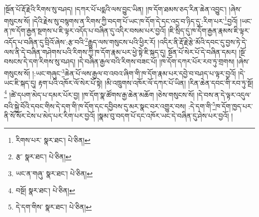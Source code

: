 །སྔོན་པོ་རྡོ་རྗེའི་རིགས་སུ་བཤད། །དཀར་པོ་པདྨའི་ལས་བྱུང་ཡིན། །ཁ་དོག་ཐམས་ཅད་རིན་ཆེན་འབྱུང་། །ཞེས་གསུངས་སོ། །དེའི་རྗེས་སུ་བསྙགས་ན་རིགས་ཀྱི་བདག་པོ་ཡང་ཁ་དོག་དེ་དང་འདྲ་བ་ཉིད་དུ་:རིག་པར་\footnote{རིགས་པར་  སྣར་ཐང་།  པེ་ཅིན། }བྱའོ། །ཡང་ན་ཁ་དོག་རྒྱན་སྔགས་པ་ཇི་ལྟར་འདོད་པ་བཞིན་དུ་འདིར་བསམ་པར་བྱའོ། །ཇི་སྲིད་དུ་ཁ་དོག་རྒྱན་རྣམས་ཇི་ལྟར་འདོད་པ་བཞིན་དུ་བྲིའོ་ཞེས་:རྩ་བའི་\footnote{རྩ་  སྣར་ཐང་།  པེ་ཅིན། }རྒྱུད་ལས་གསུངས་པའི་ཕྱིར་རོ། །འདིར་ནི་རྡོ་རྗེ་རྩེ་མོའི་དབང་དུ་བྱས་ཏེ་དེ་ལས་ནི་དེ་བཞིན་གཤེགས་པའི་རིགས་ཀྱི་ཁ་དོག་རྣམ་པར་ཕྱེ་སྟེ་ཇི་སྐད་དུ། སྔོན་པོ་སེར་པོ་དེ་བཞིན་དམར། །སྔོ་བསངས་དེ་དག་རིགས་སུ་བཤད། །དེ་བཞིན་རྒྱལ་བའི་རིགས་བཟང་པོ། །ཁ་དོག་དཀར་པོར་རབ་ཏུ་གྲགས། །ཞེས་གསུངས་སོ། །:ཡང་གཞུང་\footnote{ཡང་ན་གཞུ་  སྣར་ཐང་།  པེ་ཅིན། }ཆེན་པོ་ལས་རྒྱལ་བ་འབའ་ཞིག་གི་ཁ་དོག་རྣམ་པར་དབྱེ་བ་བཤད་པ་ལྟར་བྱའོ། །དེ་ཡང་ཇི་སྐད་དུ། རྟག་པའི་འཁོར་ལོ་སེར་པོ་སྟེ། །མི་འཁྲུགས་འཁོར་ལོ་དཀར་པོ་ཡིན། །རིན་ཆེན་དབང་གི་རབ་ཏུ་སྔོ།\footnote{བསྔོ།  སྣར་ཐང་།  པེ་ཅིན། } །ཚེ་དཔག་མེད་པ་དམར་པོར་བྱ། །ཁ་དོག་སྣ་ཚོགས་རྒྱ་ཆེན་མཆོག །ཅེས་གསུངས་སོ། །དེ་བས་ན་དེ་ལྟར་འདུལ་བའི་སྐྱེ་བོའི་དབང་གིས་དེ་དག་གི་ཁ་དོག་དང་དབྱིབས་དུ་མར་སྣང་བར་འགྱུར་བས། :དེ་དག་གི་\footnote{དེ་དག་གིས་  སྣར་ཐང་།  པེ་ཅིན། }ཁ་དོག་ཁྱད་པར་ནི་སོ་སོར་ངེས་པ་མེད་པར་རིག་པར་བྱའོ། །སྣམ་བུ་བདག་པོ་དང་འཁོར་ཡང་དེ་བཞིན་དུ་ཤེས་པར་བྱའོ། །
